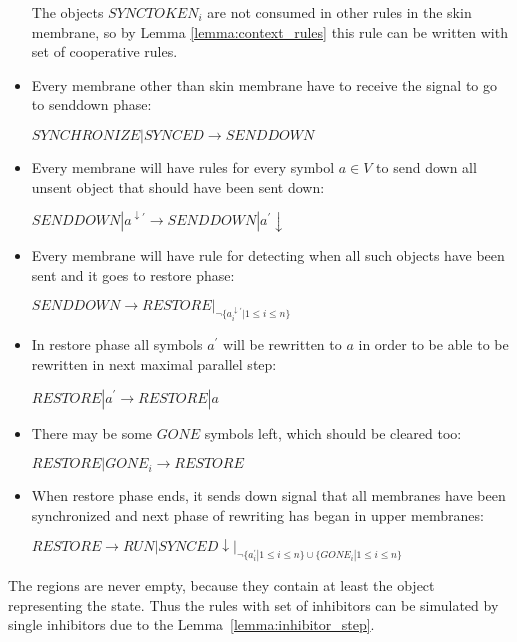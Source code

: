 \begin{dokaz}
\begin{itemize}
    The objects $SYNCTOKEN_i$ are not consumed in other rules in the skin membrane, so by Lemma \ref{lemma:context_rules} this rule can be written with set of cooperative rules.

    \item Every membrane other than skin membrane have to receive the signal to go to senddown phase:

    $SYNCHRONIZE|SYNCED \rightarrow SENDDOWN$

    \item Every membrane will have rules for every symbol $a\in V$ to send down all unsent object that should have been sent down:

    $SENDDOWN|a^{\downarrow\prime} \rightarrow SENDDOWN|a^{\prime}\downarrow$

    \item Every membrane will have rule for detecting when all such objects have been sent and it goes to restore phase:

    $SENDDOWN \rightarrow RESTORE|_{\neg \{a_i^{\downarrow\prime}|1\leq i\leq n\}}$

    \item In restore phase all symbols $a^{\prime}$ will be rewritten to $a$ in order to be able to be rewritten in next maximal parallel step:

    $RESTORE|a^{\prime} \rightarrow RESTORE|a$

    \item There may be some $GONE$ symbols left, which should be cleared too:

    $RESTORE|GONE_i \rightarrow RESTORE$

    \item When restore phase ends, it sends down signal that all membranes have been synchronized and next phase of rewriting has began in upper membranes:

    $RESTORE \rightarrow RUN|SYNCED\downarrow|_{\neg \{a_i^{\prime}|1\leq i\leq n\}\cup\{GONE_i|1\leq i\leq n\}}$
  \end{itemize}


  The regions are never empty, because they contain at least the object representing the state. Thus the rules with set of inhibitors can be simulated by single inhibitors due to the Lemma~\ref{lemma:inhibitor_step}.
\end{dokaz}

